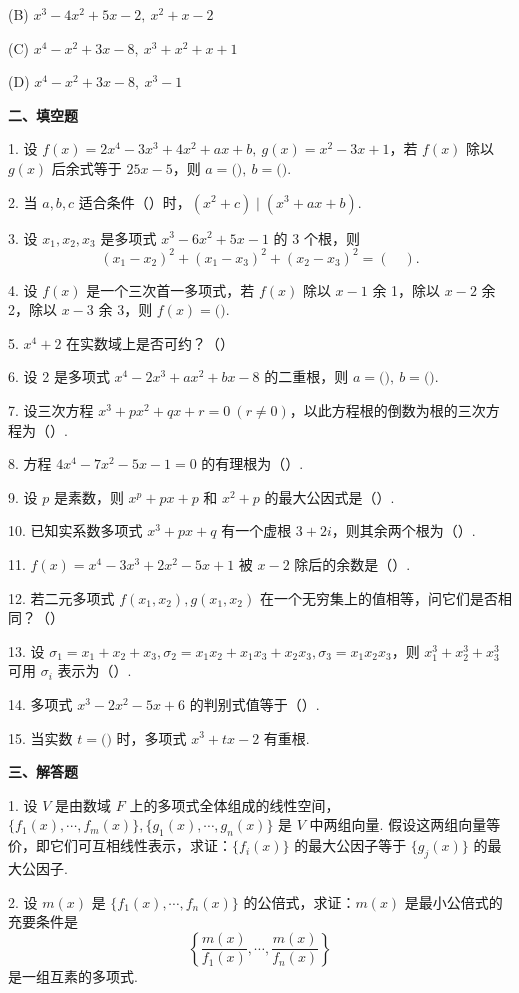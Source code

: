 \documentclass[UTF8,12pt,a4paper,fontset=fandol]{ctexart}
\begin{document}
(B) $x^3-4x^2+5x-2,\ x^2+x-2$

(C) $x^4-x^2+3x-8,\ x^3+x^2+x+1$

(D) $x^4-x^2+3x-8,\ x^3-1$

\noindent\textbf{二、填空题}

1. 设 $f(x)=2x^4-3x^3+4x^2+ax+b,\ g(x)=x^2-3x+1$，若 $f(x)$ 除以 $g(x)$ 后余式等于 $25x-5$，则 $a=($\quad $),\ b=($\quad $)$.

2. 当 $a,b,c$ 适合条件（\quad ）时，$(x^2+c)\mid(x^3+ax+b)$.

3. 设 $x_1,x_2,x_3$ 是多项式 $x^3-6x^2+5x-1$ 的 3 个根，则
\[
(x_1-x_2)^2+(x_1-x_3)^2+(x_2-x_3)^2=(\quad).
\]

4. 设 $f(x)$ 是一个三次首一多项式，若 $f(x)$ 除以 $x-1$ 余 1，除以 $x-2$ 余 2，除以 $x-3$ 余 3，则 $f(x)=($\quad $)$.

5. $x^4+2$ 在实数域上是否可约？（\quad ）

6. 设 2 是多项式 $x^4-2x^3+ax^2+bx-8$ 的二重根，则 $a=($\quad $),\ b=($\quad $)$.

7. 设三次方程 $x^3+px^2+qx+r=0\ (r\ne0)$，以此方程根的倒数为根的三次方程为（\quad ）.

8. 方程 $4x^4-7x^2-5x-1=0$ 的有理根为（\quad ）.

9. 设 $p$ 是素数，则 $x^p+px+p$ 和 $x^2+p$ 的最大公因式是（\quad ）.

10. 已知实系数多项式 $x^3+px+q$ 有一个虚根 $3+2i$，则其余两个根为（\quad ）.

11. $f(x)=x^4-3x^3+2x^2-5x+1$ 被 $x-2$ 除后的余数是（\quad ）.

12. 若二元多项式 $f(x_1,x_2),g(x_1,x_2)$ 在一个无穷集上的值相等，问它们是否相同？（\quad ）

13. 设 $\sigma_1=x_1+x_2+x_3,\sigma_2=x_1x_2+x_1x_3+x_2x_3,\sigma_3=x_1x_2x_3$，则 $x_1^3+x_2^3+x_3^3$ 可用 $\sigma_i$ 表示为（\quad ）.

14. 多项式 $x^3-2x^2-5x+6$ 的判别式值等于（\quad ）.

15. 当实数 $t=($\quad $)$ 时，多项式 $x^3+tx-2$ 有重根.

\noindent\textbf{三、解答题}

1. 设 $V$ 是由数域 $F$ 上的多项式全体组成的线性空间，$\{f_1(x),\cdots,f_m(x)\},\{g_1(x),\cdots,g_n(x)\}$ 是 $V$ 中两组向量. 假设这两组向量等价，即它们可互相线性表示，求证：$\{f_i(x)\}$ 的最大公因子等于 $\{g_j(x)\}$ 的最大公因子.

2. 设 $m(x)$ 是 $\{f_1(x),\cdots,f_n(x)\}$ 的公倍式，求证：$m(x)$ 是最小公倍式的充要条件是
\[
\left\{\frac{m(x)}{f_1(x)},\cdots,\frac{m(x)}{f_n(x)}\right\}
\]
是一组互素的多项式.
\end{document}
